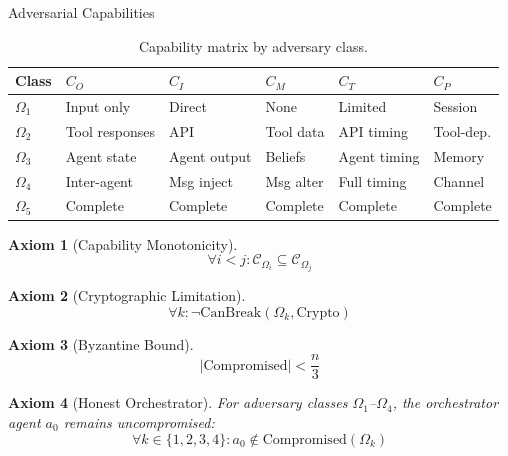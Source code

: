 \documentclass[
  ignorenonframetext,
]{beamer}
\newtheorem{axiom}{Axiom}
\begin{document}
\begin{frame}[allowframebreaks]{Adversarial Capabilities}
\begin{table}[htbp]
\centering
\caption{Capability matrix by adversary class.}
\label{tab:capability-matrix}
\begin{tabular}{@{}llllll@{}}
\toprule
Class & $C_O$ & $C_I$ & $C_M$ & $C_T$ & $C_P$ \\
\midrule
$\Omega_1$ & Input only & Direct & None & Limited & Session \\
$\Omega_2$ & Tool responses & API & Tool data & API timing & Tool-dep. \\
$\Omega_3$ & Agent state & Agent output & Beliefs & Agent timing & Memory \\
$\Omega_4$ & Inter-agent & Msg inject & Msg alter & Full timing & Channel \\
$\Omega_5$ & Complete & Complete & Complete & Complete & Complete \\
\bottomrule
\end{tabular}
\end{table}

\begin{axiom}[Capability Monotonicity]
\label{ax:capability-mono}
\begin{equation}
\label{eq:capability-mono}
\forall i < j: \mathcal{C}_{\Omega_i} \subseteq \mathcal{C}_{\Omega_j}
\end{equation}
\end{axiom}

\begin{axiom}[Cryptographic Limitation]
\label{ax:crypto-limit}
\begin{equation}
\label{eq:crypto-limit}
\forall k: \neg \text{CanBreak}(\Omega_k, \text{Crypto})
\end{equation}
\end{axiom}

\begin{axiom}[Byzantine Bound]
\label{ax:byzantine}
\begin{equation}
\label{eq:byzantine-bound}
|\text{Compromised}| < \frac{n}{3}
\end{equation}
\end{axiom}

\begin{axiom}[Honest Orchestrator]
\label{ax:honest-orchestrator}
For adversary classes $\Omega_1$--$\Omega_4$, the orchestrator agent $a_0$ remains uncompromised:
\begin{equation}
\label{eq:honest-orchestrator}
\forall k \in \{1,2,3,4\}: a_0 \notin \text{Compromised}(\Omega_k)
\end{equation}
\end{axiom}
\end{frame}
\end{document}
